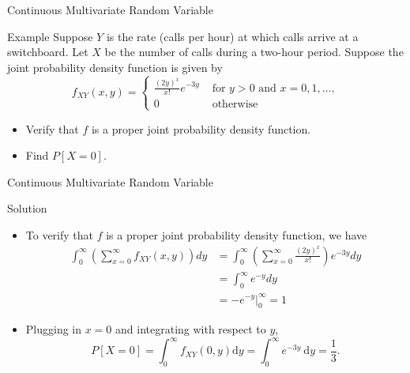 \documentclass{beamer}
\begin{document}
\begin{frame}{Continuous Multivariate Random Variable}
\begin{block}{Example}
Suppose $Y$ is the rate (calls per hour) at which calls arrive at a switchboard. Let $X$ be the number of calls during a two-hour period. Suppose the joint probability density function is given by
$$f_{X Y}(x, y)= \begin{cases}\frac{(2 y)^{x}}{x !} e^{-3 y} & \text { for } y>0 \text { and } x=0,1, \ldots, \\ 0 & \text { otherwise }\end{cases}$$
\begin{itemize}
\item Verify that $f$ is a proper joint probability density function.
\item Find $P[X=0]$.
\end{itemize}
\end{block}
\end{frame}

\begin{frame}{Continuous Multivariate Random Variable}
\begin{block}{Solution}
\begin{itemize}
\item To verify that $f$ is a proper joint probability density function, we have
$$
\begin{aligned}
\int_{0}^{\infty}\left(\sum_{x=0}^{\infty} f_{X Y}(x, y)\right) d y &=\int_{0}^{\infty}\left(\sum_{x=0}^{\infty} \frac{(2 y)^{x}}{x !}\right) e^{-3 y} d y \\
&=\int_{0}^{\infty} e^{-y} d y \\
&=-\left.e^{-y}\right|_{0} ^{\infty}=1
\end{aligned}
$$
\item Plugging in $x=0$ and integrating with respect to $y$,
$$
P[X=0]=\int_{0}^{\infty} f_{X Y}(0, y) \mathrm{d} y=\int_{0}^{\infty} e^{-3 y} \mathrm{~d} y=\frac{1}{3} .
$$
\end{itemize}
\end{block}
\end{frame}
\end{document}
